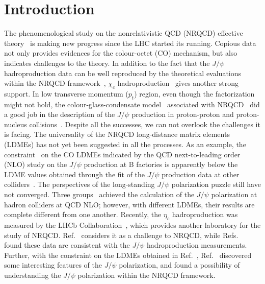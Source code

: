 \documentclass[preprint,showpacs,preprintnumbers,amssymb,aps]{revtex4}
\begin{document}
\section{Introduction}
The phenomenological study on the nonrelativistic QCD (NRQCD) effective theory~\cite{Bodwin:1994jh} is making new progress since the LHC started its running.
Copious data not only provides evidences for the colour-octet (CO) mechanism,
but also indicates challenges to the theory.
In addition to the fact that the $J/\psi$ hadroproduction data can be well reproduced by the theoretical evaluations within the NRQCD framework~\cite{Braaten:1994vv, Ma:2010yw, Butenschoen:2010rq},
$\chi_c$ hadroproduction~\cite{Ma:2010vd, Jia:2014jfa} gives another strong support.
In low transverse momentum ($p_t$) region, even though the factorization might not hold,
the colour-glass-condensate model~\cite{McLerran:1993ni, McLerran:1993ka, McLerran:1994vd} associated with NRQCD~\cite{Kang:2013hta}
did a good job in the description of the $J/\psi$ production in proton-proton and proton-nucleus collisions~\cite{Ma:2014mri, Ma:2015sia}.
Despite all the successes, we can not overlook the challenges it is facing.
The universality of the NRQCD long-distance matrix elements (LDMEs) has not yet been suggested in all the processes.
As an example, the constraint~\cite{Zhang:2009ym} on the CO LDMEs indicated by the QCD next-to-leading order (NLO) study on the $J/\psi$ production at B factories
is apparently below the LDME values obtained through the fit of the $J/\psi$ production data at other colliders~\cite{Ma:2010yw, Butenschoen:2011yh, Gong:2012ug, Bodwin:2014gia}.
The perspectives of the long-standing $J/\psi$ polarization puzzle still have not converged.
Three groups~\cite{Butenschoen:2012px, Chao:2012iv, Gong:2012ug} achieved the calculation of the $J/\psi$ polarization at hadron colliders at QCD NLO;
however, with different LDMEs, their results are complete different from one another.
Recently, the $\eta_c$ hadroproduction was measured by the LHCb Collaboration~\cite{Aaij:2014bga},
which provides another laboratory for the study of NRQCD.
Ref.~\cite{Butenschoen:2014dra} considers it as a challenge to NRQCD,
while Refs.~\cite{Han:2014jya, Zhang:2014ybe} found these data are consistent with the $J/\psi$ hadroproduction measurements.
Further, with the constraint on the LDMEs obtained in Ref.~\cite{Zhang:2014ybe},
Ref.~\cite{Sun:2015pia} discovered some interesting features of the $J/\psi$ polarization,
and found a possibility of understanding the $J/\psi$ polarization within the NRQCD framework.
\end{document}
